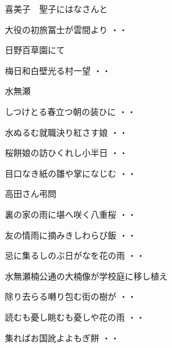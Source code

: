 喜美子　聖子にはなさんと
\begin{shiika}大役の初旅冨士が雲間より
\hfill{・・}\end{shiika}
\vspace{0.6cm}
日野百草園にて
\begin{shiika}梅日和白壁光る村一望
\hfill{・・}\end{shiika}
\vspace{0.6cm}
水無瀬
\begin{shiika}しつけとる春立つ朝の装ひに
\hfill{・・}\end{shiika}
\begin{shiika}水ぬるむ就職決り紅さす娘
\hfill{・・}\end{shiika}
\begin{shiika}桜餅娘の訪ひくれし小半日
\hfill{・・}\end{shiika}
\begin{shiika}目口なき紙の雛や掌になじむ
\hfill{・・}\end{shiika}
\vspace{0.6cm}
高田さん弔問
\begin{shiika}裏の家の雨に堪へ咲く八重桜
\hfill{・・}\end{shiika}
\begin{shiika}友の情雨に摘みきしわらび飯
\hfill{・・}\end{shiika}
\begin{shiika}忌に集るしのぶ日がなを花の雨
\hfill{・・}\end{shiika}
\vspace{0.6cm}
水無瀬楠公通の大楠像が学校庭に移し植え
\begin{shiika}除り去らる囀り包む街の樹が
\hfill{・・}\end{shiika}
\begin{shiika}読むも憂し眺むも憂しや花の雨
\hfill{・・}\end{shiika}
\begin{shiika}集ればお国訛よよもぎ餅
\hfill{・・}\end{shiika}
\vspace{0.6cm}
